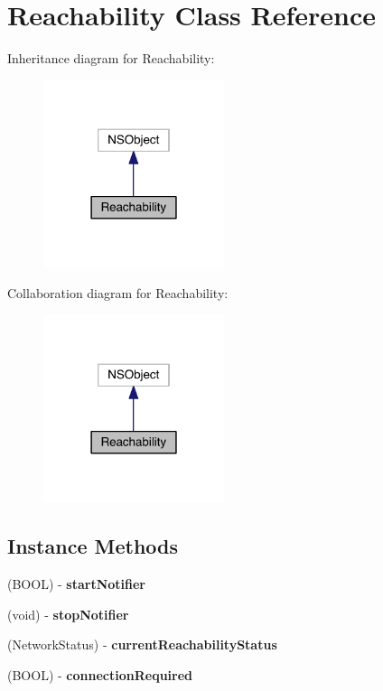 \section{Reachability Class Reference}
\label{interface_reachability}


Inheritance diagram for Reachability\+:
\nopagebreak
\begin{figure}[H]
\begin{center}
\leavevmode
\includegraphics[width=150pt]{interface_reachability__inherit__graph}
\end{center}
\end{figure}


Collaboration diagram for Reachability\+:
\nopagebreak
\begin{figure}[H]
\begin{center}
\leavevmode
\includegraphics[width=150pt]{interface_reachability__coll__graph}
\end{center}
\end{figure}
\subsection*{Instance Methods}
\begin{DoxyCompactItemize}
\item 
(B\+O\+O\+L) -\/ {\bf start\+Notifier}
\item 
(void) -\/ {\bfseries stop\+Notifier}\label{interface_reachability_ab7907e9c8de0e4e15774e82c089e0b39}

\item 
(Network\+Status) -\/ {\bfseries current\+Reachability\+Status}\label{interface_reachability_a8396438436e7ff3770039fb527cd1d34}

\item 
(B\+O\+O\+L) -\/ {\bf connection\+Required}
\end{DoxyCompactItemize}
